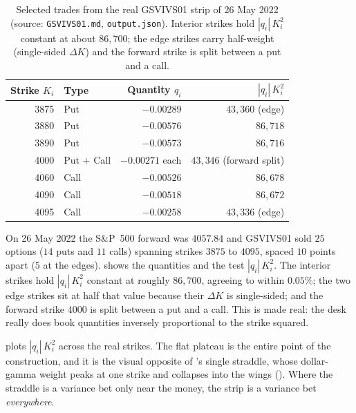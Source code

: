 \begin{table}[ht]
\centering
\caption{Selected trades from the real GSVIVS01 strip of 26 May 2022 (source: \texttt{GSVIVS01.md}, \texttt{output.json}). Interior strikes hold $|q_i|\,K_i^2$ constant at about $86{,}700$; the edge strikes carry half-weight (single-sided $\Delta K$) and the forward strike is split between a put and a call.}
\label{tab:gsvivs:strip}
\begin{tabular}{rlrr}
\toprule
Strike $K_i$ & Type & Quantity $q_i$ & $|q_i|\,K_i^2$ \\
\midrule
3875 & Put & $-0.00289$ & $43{,}360$ \quad(edge)\\
3880 & Put & $-0.00576$ & $86{,}718$ \\
3890 & Put & $-0.00573$ & $86{,}716$ \\
4000 & Put $+$ Call & $-0.00271$ each & $43{,}346$ \quad(forward split)\\
4060 & Call & $-0.00526$ & $86{,}678$ \\
4090 & Call & $-0.00518$ & $86{,}672$ \\
4095 & Call & $-0.00258$ & $43{,}336$ \quad(edge)\\
\bottomrule
\end{tabular}
\end{table}

\begin{workedexample}
On 26 May 2022 the S\&P~500 forward was $4057.84$ and GSVIVS01 sold $25$ options ($14$ puts and $11$ calls) spanning strikes $3875$ to $4095$, spaced $10$ points apart ($5$ at the edges).  shows the quantities and the test $|q_i|\,K_i^2$. The interior strikes hold $|q_i|\,K_i^2$ constant at roughly $86{,}700$, agreeing to within $0.05\%$; the two edge strikes sit at half that value because their $\Delta K$ is single-sided; and the forward strike $4000$ is split between a put and a call. This is  made real: the desk really does book quantities inversely proportional to the strike squared.
\end{workedexample}

 plots $|q_i|\,K_i^2$ across the real strikes. The flat plateau is the entire point of the construction, and it is the visual opposite of 's single straddle, whose dollar-gamma weight peaks at one strike and collapses into the wings (). Where the straddle is a variance bet only near the money, the strip is a variance bet \emph{everywhere}.

